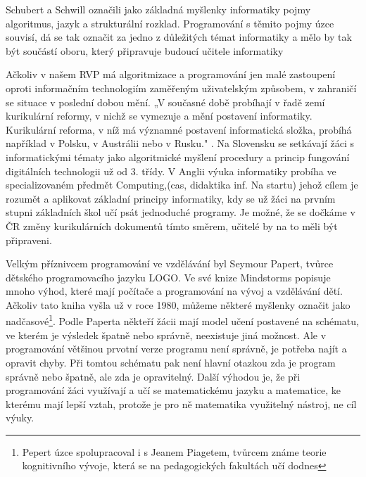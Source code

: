\documentclass[FP,DP]{tulthesis}
\begin{document}
{{{{{{{Schubert a Schwill \citep{didaktikderinformatik} označili jako základná myšlenky informatiky pojmy algoritmus, jazyk a strukturální rozklad. Programování s těmito pojmy úzce souvisí, dá se tak označit za jedno z důležitých témat informatiky a mělo by tak být součástí oboru, který připravuje budoucí učitele informatiky

Ačkoliv v našem RVP má algoritmizace a programování jen malé zastoupení oproti informačním technologiím zaměřeným uživatelským způsobem, v zahraničí se situace v poslední  dobou mění. „V současné době probíhají v řadě zemí kurikulární reformy, v nichž se vymezuje a mění postavení informatiky. Kurikulární reforma, v níž má významné postavení informatická složka, probíhá například v Polsku, v Austrálii nebo v Rusku." \citep{nastartu}. Na Slovensku se setkávají žáci s informatickými tématy jako algoritmické myšlení procedury a princip fungování digitálních technologii  už od 3. třídy. V Anglii výuka informatiky probíha ve specializovaném  předmět Computing,(cas, didaktika inf. Na startu) jehož cílem je rozumět a aplikovat základní principy informatiky, kdy se už žáci na prvním stupni základních škol učí psát jednoduché programy.  \citep{england2013}  Je možné, že se dočkáme v ČR změny kurikulárních dokumentů tímto směrem, učitelé by na to měli být připraveni.

 Velkým příznivcem programování ve vzdělávání byl Seymour Papert, tvůrce dětského programovacího jazyku LOGO. Ve své knize Mindstorms  \citep{mindstorms}popisuje mnoho výhod, které mají  počítače a programování na vývoj a vzdělávání dětí. Ačkoliv tato kniha vyšla už v roce 1980, můžeme některé myšlenky označit jako nadčasové\footnote{Pepert úzce spolupracoval i s Jeanem Piagetem, tvůrcem známe teorie kognitivního vývoje, která se na pedagogických fakultách učí dodnes}. Podle Paperta někteří žácii mají model učení postavené na schématu, ve kterém je výsledek špatně nebo správně, neexistuje jiná možnost. Ale v programování většinou prvotní verze programu není správně, je potřeba najít a opravit chyby. Při tomtou schématu  pak není hlavní otazkou zda je program správně nebo špatně, ale zda je opravitelný. Další výhodou je, že při programování žáci využívají a učí se matematickému jazyku a matematice, ke kterému mají lepší vztah, protože je pro ně matematika využitelný nástroj, ne cíl výuky.



}}}}}}}
\end{document}
